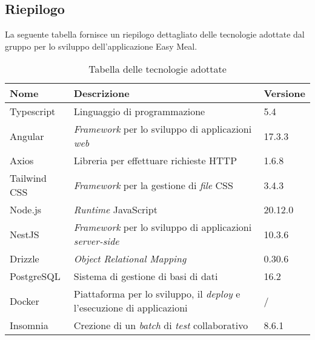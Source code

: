 \subsection{Riepilogo}
La seguente tabella fornisce un riepilogo dettagliato delle tecnologie adottate dal gruppo per lo sviluppo dell'applicazione Easy Meal.
\begin{table}[H]
	\centering
	\begin{tabularx}{\textwidth}{lXl}
		\hline
		\textbf{Nome} & \textbf{Descrizione}                                                           & \textbf{Versione} \\
		\hline
		Typescript    & Linguaggio di programmazione                                                   & 5.4               \\
		\hline
		Angular       & \textit{Framework} per lo sviluppo di applicazioni \textit{web}                & 17.3.3            \\
		\hline
		Axios         & Libreria per effettuare richieste HTTP                                         & 1.6.8             \\
		\hline
		Tailwind CSS  & \textit{Framework} per la gestione di \textit{file} CSS                        & 3.4.3             \\
		\hline
		Node.js       & \textit{Runtime} JavaScript                                                    & 20.12.0           \\
		\hline
		NestJS        & \textit{Framework} per lo sviluppo di applicazioni \textit{server-side}        & 10.3.6            \\
		\hline
		Drizzle       & \textit{Object Relational Mapping}                                             & 0.30.6            \\
		\hline
		PostgreSQL    & Sistema di gestione di basi di dati                                            & 16.2              \\
		\hline
		Docker        & Piattaforma per lo sviluppo, il \textit{deploy} e l'esecuzione di applicazioni & /                 \\
		\hline
		Insomnia      & Crezione di un \textit{batch} di \textit{test} collaborativo                   & 8.6.1             \\
		\hline
	\end{tabularx}
	\caption{Tabella delle tecnologie adottate}
\end{table}
